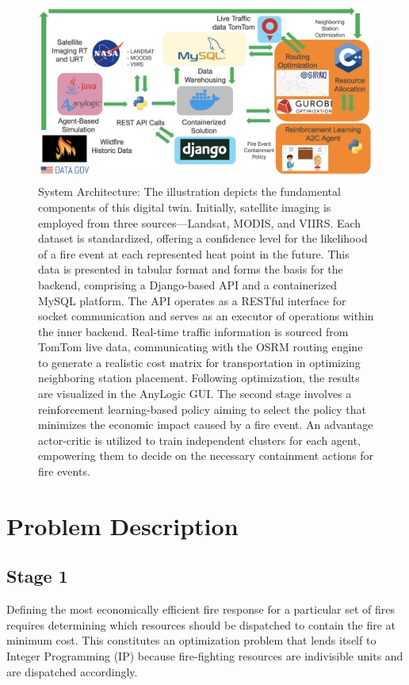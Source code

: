 \documentclass[lettersize,journal]{IEEEtran}
\begin{document}
\begin{figure}
  \centering
  \includegraphics[height=6cm,width=12cm]{figs/Arch.png}
  \caption{
    System Architecture: The illustration depicts the fundamental components of this digital twin. Initially, satellite imaging is employed from three sources—Landsat, MODIS, and VIIRS. Each dataset is standardized, offering a confidence level for the likelihood of a fire event at each represented heat point in the future. This data is presented in tabular format and forms the basis for the backend, comprising a Django-based API and a containerized MySQL platform. The API operates as a RESTful interface for socket communication and serves as an executor of operations within the inner backend. Real-time traffic information is sourced from TomTom live data, communicating with the OSRM routing engine to generate a realistic cost matrix for transportation in optimizing neighboring station placement. Following optimization, the results are visualized in the AnyLogic GUI. The second stage involves a reinforcement learning-based policy aiming to select the policy that minimizes the economic impact caused by a fire event. An advantage actor-critic is utilized to train independent clusters for each agent, empowering them to decide on the necessary containment actions for fire events. }\label{fig:arch}
  
\end{figure}

\section{Problem Description}\label{Problem Description}

\subsection{Stage 1}
Defining the most economically efficient fire response for a particular set of fires requires determining which resources should be dispatched to contain the fire at minimum cost. This constitutes an optimization problem that lends itself to Integer Programming (IP) because fire-fighting resources are indivisible units and are dispatched accordingly.
\end{document}
